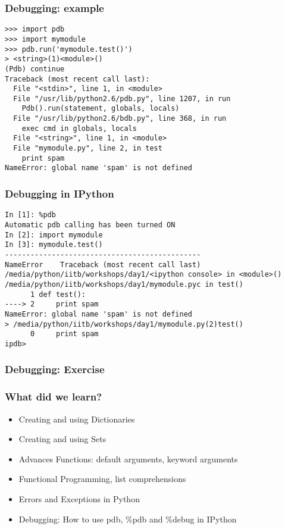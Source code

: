 \documentclass[14pt,compress]{beamer}
\newcounter{time}
\newcommand{\inctime}[1]{\addtocounter{time}{#1}{\tiny \thetime\ m}}
\begin{document}
\begin{frame}[fragile]
\frametitle{Debugging: example}
\small
\begin{lstlisting}
>>> import pdb
>>> import mymodule
>>> pdb.run('mymodule.test()')
> <string>(1)<module>()
(Pdb) continue
Traceback (most recent call last):
  File "<stdin>", line 1, in <module>
  File "/usr/lib/python2.6/pdb.py", line 1207, in run
    Pdb().run(statement, globals, locals)
  File "/usr/lib/python2.6/bdb.py", line 368, in run
    exec cmd in globals, locals
  File "<string>", line 1, in <module>
  File "mymodule.py", line 2, in test
    print spam
NameError: global name 'spam' is not defined
\end{lstlisting}
\end{frame}

\begin{frame}[fragile]
\frametitle{Debugging in IPython}
\small
\begin{lstlisting}
In [1]: %pdb
Automatic pdb calling has been turned ON
In [2]: import mymodule
In [3]: mymodule.test()
----------------------------------------------
NameError    Traceback (most recent call last)
/media/python/iitb/workshops/day1/<ipython console> in <module>()
/media/python/iitb/workshops/day1/mymodule.pyc in test()
      1 def test():
----> 2     print spam
NameError: global name 'spam' is not defined
> /media/python/iitb/workshops/day1/mymodule.py(2)test()
      0     print spam
ipdb>
\end{lstlisting}
\inctime{15} 
\end{frame}

\begin{frame}[fragile]
\frametitle{Debugging: Exercise}
\inctime{10}
\end{frame}

\begin{frame}
  \frametitle{What did we learn?}
  \begin{itemize}
    \item Creating and using Dictionaries
    \item Creating and using Sets
    \item Advances Functions: default arguments, keyword arguments
    \item Functional Programming, list comprehensions
    \item Errors and Exceptions in Python
    \item Debugging: How to use pdb, \%pdb and \%debug in IPython
  \end{itemize}
\end{frame}
\end{document}
